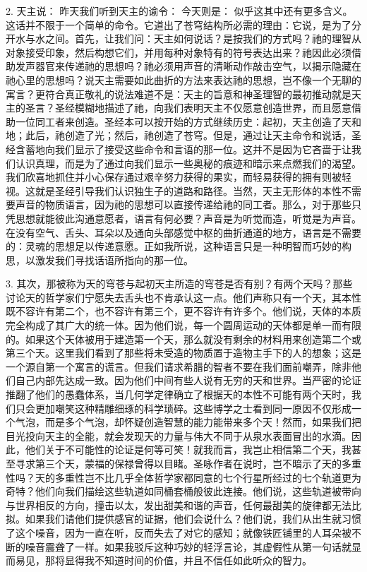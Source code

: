 2. 天主说：  昨天我们听到天主的谕令： 今天则是： 似乎这其中还有更多含义。这话并不限于一个简单的命令。它道出了苍穹结构所必需的理由：它说，是为了分开水与水之间。首先，让我们问：天主如何说话？是按我们的方式吗？祂的理智从对象接受印象，然后构想它们，并用每种对象特有的符号表达出来？祂因此必须借助发声器官来传递祂的思想吗？祂必须用声音的清晰动作敲击空气，以揭示隐藏在祂心里的思想吗？说天主需要如此曲折的方法来表达祂的思想，岂不像一个无聊的寓言？更符合真正敬礼的说法难道不是：天主的旨意和神圣理智的最初推动就是天主的圣言？圣经模糊地描述了祂，向我们表明天主不仅愿意创造世界，而且愿意借助一位同工者来创造。圣经本可以按开始的方式继续历史：起初，天主创造了天和地；此后，祂创造了光；然后，祂创造了苍穹。但是，通过让天主命令和说话，圣经含蓄地向我们显示了接受这些命令和言语的那一位。这并不是因为它吝啬于让我们认识真理，而是为了通过向我们显示一些奥秘的痕迹和暗示来点燃我们的渴望。我们欣喜地抓住并小心保存通过艰辛努力获得的果实，而轻易获得的拥有则被轻视。这就是圣经引导我们认识独生子的道路和路径。当然，天主无形体的本性不需要声音的物质语言，因为祂的思想可以直接传递给祂的同工者。那么，对于那些只凭思想就能彼此沟通意愿者，语言有何必要？声音是为听觉而造，听觉是为声音。在没有空气、舌头、耳朵以及通向头部感觉中枢的曲折通道的地方，语言是不需要的：灵魂的思想足以传递意愿。正如我所说，这种语言只是一种明智而巧妙的构思，以激发我们寻找话语所指向的那一位。\par

3. 其次，那被称为天的穹苍与起初天主所造的穹苍是否有别？有两个天吗？那些讨论天的哲学家们宁愿失去舌头也不肯承认这一点。他们声称只有一个天，其本性既不容许有第二个，也不容许有第三个，更不容许有许多个。他们说，天体的本质完全构成了其广大的统一体。因为他们说，每一个圆周运动的天体都是单一而有限的。如果这个天体被用于建造第一个天，那么就没有剩余的材料用来创造第二个或第三个天。这里我们看到了那些将未受造的物质置于造物主手下的人的想象；这是一个源自第一个寓言的谎言。但我们请求希腊的智者不要在我们面前嘲弄，除非他们自己内部先达成一致。因为他们中间有些人说有无穷的天和世界。当严密的论证推翻了他们的愚蠢体系，当几何学定律确立了根据天的本性不可能有两个天时，我们只会更加嘲笑这种精雕细琢的科学琐碎。这些博学之士看到同一原因不仅形成一个气泡，而是多个气泡，却怀疑创造智慧的能力能带来多个天！然而，如果我们把目光投向天主的全能，就会发现天的力量与伟大不同于从泉水表面冒出的水滴。因此，他们关于不可能性的论证是何等可笑！就我而言，我岂止相信第二个天，我甚至寻求第三个天，蒙福的保禄曾得以目睹。圣咏作者在说时，岂不暗示了天的多重性吗？天的多重性岂不比几乎全体哲学家都同意的七个行星所经过的七个轨道更为奇特？他们向我们描绘这些轨道如同桶套桶般彼此连接。他们说，这些轨道被带向与世界相反的方向，撞击以太，发出甜美和谐的声音，任何最甜美的旋律都无法比拟。如果我们请他们提供感官的证据，他们会说什么？他们说，我们从出生就习惯了这个噪音，因为一直在听，反而失去了对它的感知；就像铁匠铺里的人耳朵被不断的噪音震聋了一样。如果我驳斥这种巧妙的轻浮言论，其虚假性从第一句话就显而易见，那将显得我不知道时间的价值，并且不信任如此听众的智力。\par

